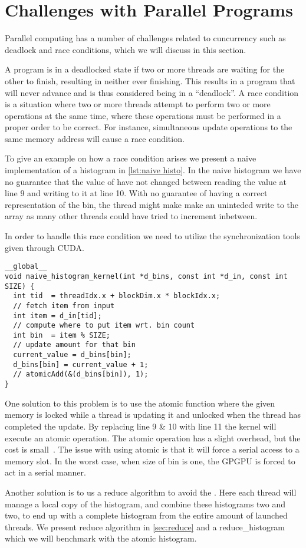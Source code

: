 \section{Challenges with Parallel Programs}
\label{sec:challenges with parallel programs}

Parallel computing has a number of challenges related to cuncurrency such as deadlock and race conditions, which we will discuss in this section.

A program is in a deadlocked state if two or more threads are waiting for the other to finish, resulting in neither ever finishing.
This results in a program that will never advance and is thus considered being in a ``deadlock''.
A race condition is a situation where two or more threads attempt to perform two or more operations at the same time, where these operations must be performed in a proper order to be correct.
For instance, simultaneous update operations to the same memory address will cause a race condition.~\cite{farber2011cuda}

To give an example on how a race condition arises we present a naive implementation of a histogram in \cref{lst:naive histo}.
In the naive histogram we have no guarantee that the value of  have not changed between reading the value at line 9 and writing to it at line 10.
With no guarantee of having a correct representation of the bin, the thread might make make an uninteded write to the array as many other threads could have tried to increment inbetween.

In order to handle this race condition we need to utilize the synchronization tools given through CUDA.

\begin{lstlisting}[caption={Naive histogram implementation with race condition}, label={lst:naive histo}]
__global__
void naive_histogram_kernel(int *d_bins, const int *d_in, const int SIZE) {
  int tid  = threadIdx.x + blockDim.x * blockIdx.x;
  // fetch item from input
  int item = d_in[tid];
  // compute where to put item wrt. bin count
  int bin  = item % SIZE;
  // update amount for that bin
  current_value = d_bins[bin];
  d_bins[bin] = current_value + 1;
  // atomicAdd(&(d_bins[bin]), 1);
}
\end{lstlisting}

One solution to this problem is to use the atomic function where the given memory is locked while a thread is updating it and unlocked when the thread has completed the update.
By replacing line 9 \& 10 with line 11 the kernel will execute an atomic operation.
The atomic operation has a slight overhead, but the cost is small~\cite{udacity}.
The issue with using atomic is that it will force a serial access to a memory slot.
In the worst case, when size of bin is one, the GPGPU is forced to act in a serial manner.


Another solution is to us a reduce algorithm to avoid the .
Here each thread will manage a local copy of the histogram, and combine these histograms two and two, to end up with a complete histogram from the entire amount of launched threads.
We present reduce algorithm in \cref{sec:reduce} and a reduce\_histogram which we will benchmark with the atomic histogram.
